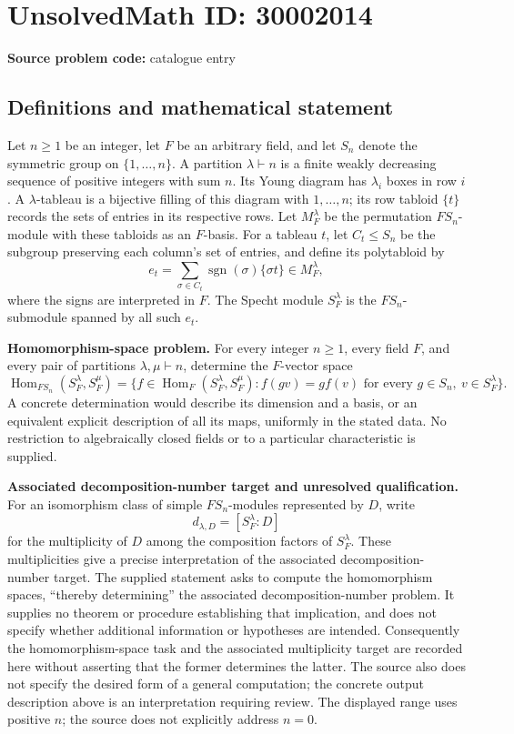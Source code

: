 \documentclass[11pt]{article}
\begin{document}
\section*{UnsolvedMath ID: 30002014}
\textbf{Source problem code:} catalogue entry
\subsection{Definitions and mathematical statement}
Let \(n\geq 1\) be an integer, let \(F\) be an arbitrary field, and let \(S_n\) denote the symmetric group on \(\{1,\ldots,n\}\). A partition \(\lambda\vdash n\) is a finite weakly decreasing sequence of positive integers with sum \(n\). Its Young diagram has \(\lambda_i\) boxes in row \(i\). A \(\lambda\)-tableau is a bijective filling of this diagram with \(1,\ldots,n\); its row tabloid \(\{t\}\) records the sets of entries in its respective rows. Let \(M_F^\lambda\) be the permutation \(F S_n\)-module with these tabloids as an \(F\)-basis. For a tableau \(t\), let \(C_t\leq S_n\) be the subgroup preserving each column's set of entries, and define its polytabloid by
\[
e_t=\sum_{\sigma\in C_t}\operatorname{sgn}(\sigma)\{\sigma t\}\in M_F^\lambda,
\]
where the signs are interpreted in \(F\). The Specht module \(S_F^\lambda\) is the \(F S_n\)-submodule spanned by all such \(e_t\).

\textbf{Homomorphism-space problem.} For every integer \(n\geq1\), every field \(F\), and every pair of partitions \(\lambda,\mu\vdash n\), determine the \(F\)-vector space
\[
\operatorname{Hom}_{F S_n}(S_F^\lambda,S_F^\mu)
=
\bigl\{f\in\operatorname{Hom}_F(S_F^\lambda,S_F^\mu):
 f(gv)=g f(v)\text{ for every }g\in S_n,\ v\in S_F^\lambda\bigr\}.
\]
A concrete determination would describe its dimension and a basis, or an equivalent explicit description of all its maps, uniformly in the stated data. No restriction to algebraically closed fields or to a particular characteristic is supplied.

\textbf{Associated decomposition-number target and unresolved qualification.} For an isomorphism class of simple \(F S_n\)-modules represented by \(D\), write
\[
d_{\lambda,D}=[S_F^\lambda:D]
\]
for the multiplicity of \(D\) among the composition factors of \(S_F^\lambda\). These multiplicities give a precise interpretation of the associated decomposition-number target. The supplied statement asks to compute the homomorphism spaces, ``thereby determining'' the associated decomposition-number problem. It supplies no theorem or procedure establishing that implication, and does not specify whether additional information or hypotheses are intended. Consequently the homomorphism-space task and the associated multiplicity target are recorded here without asserting that the former determines the latter. The source also does not specify the desired form of a general computation; the concrete output description above is an interpretation requiring review. The displayed range uses positive \(n\); the source does not explicitly address \(n=0\).
\end{document}

